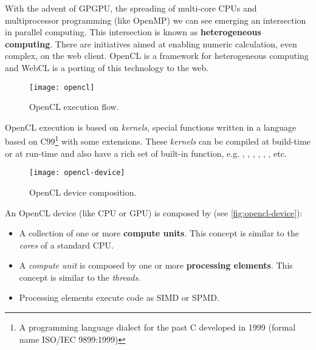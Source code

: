 
With the advent of \ac{GPGPU}, the spreading of multi-core CPUs and multiprocessor
programming (like OpenMP) we can see emerging an intersection in parallel computing.
This intersection is known as \textbf{heterogeneous computing}. There are
initiatives aimed at enabling numeric calculation, even complex, on the web client.
\ac{OpenCL} is a framework for heterogeneous computing and \ac{WebCL} is a porting
of this technology to the web.\\

\begin{figure}[htb]
    \centering
    \texttt{[image: opencl]}
    \caption{OpenCL execution flow.}
    \label{fig:opencl}
\end{figure}
\ac{OpenCL} execution is based on \emph{kernels}, special functions written in
a language based on C99\footnote{A programming language dialect for the past C
developed in 1999 (formal name ISO/IEC 9899:1999)} with some extensions. These
\emph{kernels} can be compiled at build-time or at run-time and also have a rich
set of built-in function, e.g. , , , ,
, , etc.

\begin{figure}[htb]
    \centering
    \texttt{[image: opencl-device]}
    \caption{OpenCL device composition.}
    \label{fig:opencl-device}
\end{figure}
An \ac{OpenCL} device (like CPU or GPU) is composed by (see
\autoref{fig:opencl-device}):
\begin{itemize}
    \item A collection of one or more \textbf{compute units}. This concept is
    similar to the \emph{cores} of a standard CPU.

    \item A \emph{compute unit} is composed by one or more \textbf{processing
    elements}. This concept is similar to the \emph{threads}.

    \item Processing elements execute code as \ac{SIMD} or \ac{SPMD}.
\end{itemize}

